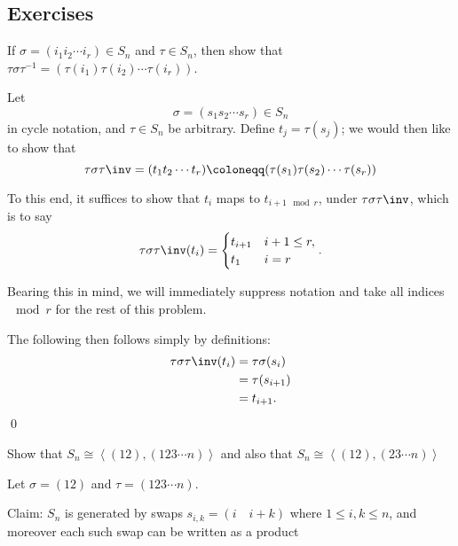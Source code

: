 \subsection{Exercises}

\begin{problem}[Hungerford 1.6.3]
If $\sigma = (i_1 i_2 \cdots i_r) \in S_n$ and $\tau \in S_n$, then show that $\tau\sigma\tau^{-1} = (\tau(i_1) \tau(i_2) \cdots \tau(i_r))$.
\end{problem}

\begin{solution}
  Let
  $$\sigma = (s_1 s_2 \cdots s_r) \in S_n$$
  in cycle notation, and $\tau \in S_n$ be arbitrary. Define $t_j = \tau(s_j)$; we would then like to show that $$\tau\sigma\tau\inv = (t_1 t_2 \cdots t_r) \coloneqq (\tau(s_1) \tau(s_2) \cdots \tau(s_r))$$

  To this end, it suffices to show that $t_i$ maps to $t_{i+1 \mod r}$, under $\tau\sigma\tau\inv$, which is to say
  $$
  \tau\sigma\tau\inv(t_i) =
  \begin{cases}
    t_{i+1} & i+1 \leq r, \\
    t_1 & i = r
  \end{cases}.
  $$

  Bearing this in mind, we will immediately suppress notation and take all indices $\mod r$ for the rest of this problem.

  The following then follows simply by definitions:
  \begin{align*}
  \tau\sigma\tau\inv(t_i) &= \tau\sigma(s_i) \\
                          &= \tau(s_{i+1}) \\
                          &= t_{i+1}
  .\end{align*}
  \qed
\end{solution}

\begin{problem}[Hungerford 1.6.4]
\label{prob:1.2}
Show that $S_n \cong \left\langle (12), (123\cdots n)\right\rangle$ and also that $S_n \cong \left\langle (12), (23\cdots n)\right\rangle$
\end{problem}

\begin{solution}
  Let $\sigma = (12)$ and $\tau = (123\cdots n)$.

  Claim: $S_n$ is generated by swaps $s_{i, k} = (i \quad i+k)$ where  $1 \leq i, k \leq n$, and moreover each such swap can be written as a product
\end{solution}

